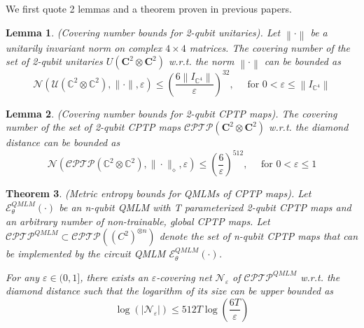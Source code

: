 \documentclass[%
 reprint,
superscriptaddress,
 amsmath,amssymb,
 aps,
]{revtex4-2}
\newcommand{\E}{\mathcal{E}}
\newcommand{\norm}[1]{\left\lVert#1\right\rVert}
\newtheorem{theorem}{Theorem}[section]
\newtheorem{lemma}[theorem]{Lemma}
\begin{document}
We first quote 2 lemmas and a theorem proven in previous papers.

\begin{lemma}
    (Covering number bounds for 2-qubit unitaries). Let $\norm{\cdot}$ be a unitarily invariant norm on complex $4 \times 4$ matrices. The covering number of the set of 2-qubit unitaries $U(\mathbf{C}^2 \otimes \mathbf{C}^2)$ w.r.t. the norm $\norm{\cdot}$ can be bounded as
    \begin{equation}
    \mathcal{N}\left(\mathcal{U}\left(\mathbb{C}^2 \otimes \mathbb{C}^2\right),\|\cdot\|, \varepsilon\right) \leqslant\left(\frac{6\left\|I_{\mathbb{C}^4}\right\|}{\varepsilon}\right)^{32}, \quad \text { for } 0<\varepsilon \leqslant\left\|I_{\mathbb{C}^4}\right\|
    \end{equation}
\end{lemma}

\begin{lemma}
    (Covering number bounds for 2-qubit CPTP maps). The covering number of the set of 2-qubit CPTP maps $\mathcal{CPTP}(\mathbf{C}^2 \otimes \mathbf{C}^2)$ w.r.t. the diamond distance can be bounded as
    \begin{equation}
    \mathcal{N}\left(\mathcal{CPTP}\left(\mathbb{C}^2 \otimes \mathbb{C}^2\right),\|\cdot\|_\diamond, \varepsilon\right) \leqslant\left(\frac{6}{\varepsilon}\right)^{512}, \quad \text { for } 0<\varepsilon \leqslant1
    \end{equation}
\end{lemma}

\begin{theorem}
    (Metric entropy bounds for QMLMs of CPTP maps). Let $\E^{QMLM}_\theta(\cdot)$ be an n-qubit QMLM with T parameterized 2-qubit CPTP maps and an arbitrary number of non-trainable, global CPTP maps. Let $\mathcal{CPTP}^{QMLM}\subset \mathcal{CPTP}((C^2)^{\otimes n})$ denote the set of n-qubit CPTP maps that can be implemented by the circuit QMLM $\E^{QMLM}_\theta(\cdot)$.

    For any $\varepsilon \in (0, 1]$, there exists an $\varepsilon$-covering net $\mathcal{N}_\varepsilon$ of $\mathcal{CPTP}^{QMLM}$ w.r.t. the diamond distance such that the logarithm of its size can be upper bounded as
    \begin{equation}
        \log(|\mathcal{N_\varepsilon}|)\le 512T\log\left(\frac{6T}{\varepsilon}\right)
    \end{equation}
    \label{thm: Metric entropy bounds}
\end{theorem}
\end{document}
